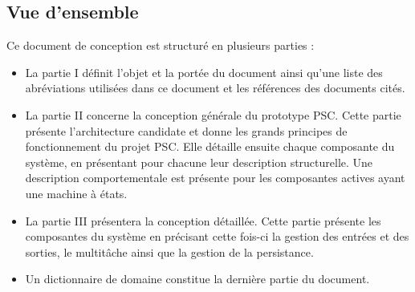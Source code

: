 \subsection{Vue d'ensemble}

Ce document de conception est structuré en plusieurs parties :
\begin{itemize}
      \item La partie I définit l’objet et la portée du document ainsi qu’une liste des abréviations utilisées dans ce document et les références des documents cités.
      \item La partie II concerne la conception générale du prototype PSC. 
      Cette partie présente l’architecture candidate et donne les grands principes de fonctionnement du projet PSC. 
      Elle détaille ensuite chaque composante du système, en présentant pour chacune leur description structurelle. 
      Une description comportementale est présente pour les composantes actives ayant une machine à états.
      \item La partie III présentera la conception détaillée. Cette partie présente les composantes du système en précisant cette fois-ci la gestion des entrées et des sorties, le multitâche ainsi que la gestion de la persistance.
      \item Un dictionnaire de domaine constitue la dernière partie du document.
\end{itemize}